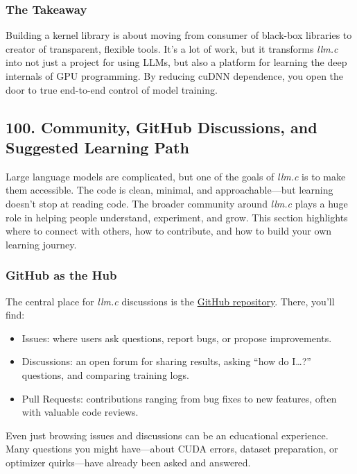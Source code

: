 \documentclass[
  letterpaper,
  DIV=11,
  numbers=noendperiod]{scrreprt}
\providecommand{\tightlist}{%
  \setlength{\itemsep}{0pt}\setlength{\parskip}{0pt}}
\begin{document}
\subsubsection{The Takeaway}\label{the-takeaway-88}

Building a kernel library is about moving from consumer of black-box
libraries to creator of transparent, flexible tools. It's a lot of work,
but it transforms \emph{llm.c} into not just a project for using LLMs,
but also a platform for learning the deep internals of GPU programming.
By reducing cuDNN dependence, you open the door to true end-to-end
control of model training.

\subsection{100. Community, GitHub Discussions, and Suggested Learning
Path}\label{community-github-discussions-and-suggested-learning-path}

Large language models are complicated, but one of the goals of
\emph{llm.c} is to make them accessible. The code is clean, minimal, and
approachable---but learning doesn't stop at reading code. The broader
community around \emph{llm.c} plays a huge role in helping people
understand, experiment, and grow. This section highlights where to
connect with others, how to contribute, and how to build your own
learning journey.

\subsubsection{GitHub as the Hub}\label{github-as-the-hub}

The central place for \emph{llm.c} discussions is the
\href{https://github.com/karpathy/llm.c}{GitHub repository}. There,
you'll find:

\begin{itemize}
\tightlist
\item
  Issues: where users ask questions, report bugs, or propose
  improvements.
\item
  Discussions: an open forum for sharing results, asking ``how do
  I\ldots?'' questions, and comparing training logs.
\item
  Pull Requests: contributions ranging from bug fixes to new features,
  often with valuable code reviews.
\end{itemize}

Even just browsing issues and discussions can be an educational
experience. Many questions you might have---about CUDA errors, dataset
preparation, or optimizer quirks---have already been asked and answered.
\end{document}
